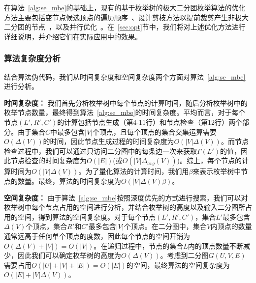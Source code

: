 在算法~\ref{alg:se_mbe}的基础上，现有的基于枚举树的极大二分团枚举算法的优化方法主要包括变节点候选顶点的遍历顺序~\cite{minel06,iMBEA14,PMBE20,ooMBE22}、设计剪枝方法以提前裁剪产生非极大二分团的节点~\cite{iMBEA14,PMBE20,ooMBE22}，以及并行优化~\cite{mapreduceMBE16,parMBE19}。在~\ref{sec:opt}节中，我们将对上述优化方法进行详细说明，并介绍它们在实际应用中的效果。

\subsubsection{算法复杂度分析}
\label{subsec:baseline_analysis}

结合算法伪代码，我们从时间复杂度和空间复杂度两个方面对算法~\ref{alg:se_mbe}进行分析。

\textbf{时间复杂度：} 我们首先分析枚举树中每个节点的计算时间，随后分析枚举树中的枚举节点数量，最终得到算法~\ref{alg:se_mbe}的时间复杂度。平均而言，对于每个节点$(L',R',C')$的计算包括节点生成（第4-11行）和节点检查（第12行）两个部分。由于集合$C$中最多包含$|V|$个顶点，且每个顶点的集合交集运算需要$O(\Delta(V))$的时间，因此节点生成过程的时间复杂度为$O(|V|\Delta(V))$。而节点检查过程中，我们可以通过只访问二分图中的每条边一次来获取$\Gamma(L')$的值，因此节点检查的时间复杂度为$O(|E|)$(或$O(|V|\Delta_{avg}(V))$)。综上，每个节点的计算时间为$O(|V|\Delta(V))$。为了量化算法的计算时间，我们用$\beta$来表示枚举树中节点的数量。最终，算法的时间复杂度为$O(|V|\Delta(V)\beta)$。

\textbf{空间复杂度：} 由于算法~\ref{alg:se_mbe}按照深度优先的方式进行搜索，我们可以对枚举树中每个节点占用的空间进行分析，并结合枚举树的高度以及输入二分图所占用的空间，得到算法的空间复杂度。对于每个节点$(L',R',C')$，集合$L'$最多包含$\Delta(V)$个顶点，集合$R'$和$C'$最多包含$|V|$个顶点。在二分图中，集合$V$内顶点的数量通常远高于任何单个顶点的度数，因此每个节点的空间开销为$O(\Delta(V)+|V|)=O(|V|)$。在递归过程中，节点的集合$L$内的顶点数量不断减少，因此我们可以确定枚举树的高度为$O(\Delta(V))$。考虑到二分图$G(U,V,E)$需要占用$O(|U|+|V|+|E|)=O(|E|)$的空间，最终算法的空间复杂度为$O(|E|+|V|\Delta(V))$。

